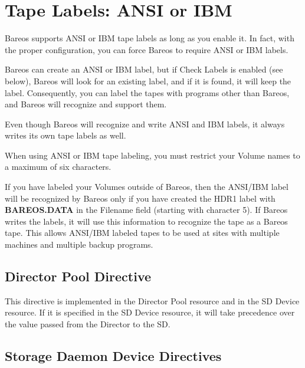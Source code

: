 
\section{Tape Labels: ANSI or IBM}
\label{AnsiLabelsChapter}

Bareos supports ANSI or IBM tape labels as long as you
enable it.  In fact, with the proper configuration, you can
force Bareos to require ANSI or IBM labels.

Bareos can create an ANSI or IBM label, but if Check Labels is
enabled (see below), Bareos will look for an existing label, and
if it is found, it will keep the label. Consequently, you
can label the tapes with programs other than Bareos, and Bareos
will recognize and support them.

Even though Bareos will recognize and write ANSI and IBM labels,
it always writes its own tape labels as well.

When using ANSI or IBM tape labeling, you must restrict your Volume
names to a maximum of six characters.

If you have labeled your Volumes outside of Bareos, then the
ANSI/IBM label will be recognized by Bareos only if you have created
the HDR1 label with {\bf BAREOS.DATA} in the Filename field (starting
with character 5).  If Bareos writes the labels, it will use
this information to recognize the tape as a Bareos tape.  This allows
ANSI/IBM labeled tapes to be used at sites with multiple machines
and multiple backup programs.


\subsection{Director Pool Directive}

\begin{description}
  This directive is implemented in the Director Pool resource and in the SD Device
  resource.  If it is specified in the SD Device resource, it will take
  precedence over the value passed from the Director to the SD.
\end{description}

\subsection{Storage Daemon Device Directives}

